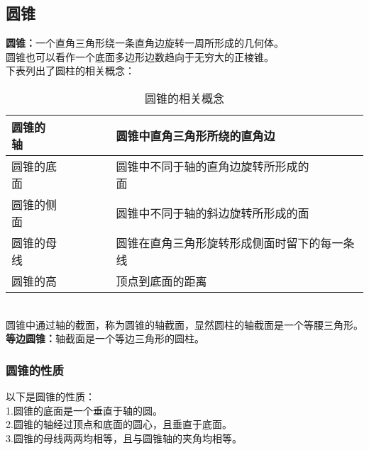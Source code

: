 \documentclass[UTF8]{ctexart}
\begin{document}
\subsection{圆锥}
    \textbf{圆锥：}一个直角三角形绕一条直角边旋转一周所形成的几何体。\\[3mm]
    圆锥也可以看作一个底面多边形边数趋向于无穷大的正棱锥。\\[3mm]
    下表列出了圆柱的相关概念：\vspace{5pt}
    \begin{table}[h]
        \begin{center}
            \begin{tabular}{l|l}
                \hline
                圆锥的轴~~~~~~~~&圆锥中直角三角形所绕的直角边~~~~~~~~\\ \hline
                圆锥的底面~~~~~~~~&圆锥中不同于轴的直角边旋转所形成的面~~~~~~~~\\ \hline
                圆锥的侧面~~~~~~~~&圆锥中不同于轴的斜边旋转所形成的面~~~~~~~~\\ \hline
                圆锥的母线~~~~~~~~&圆锥在直角三角形旋转形成侧面时留下的每一条线~~~~~~~~\\ \hline
                圆锥的高~~~~~~~~&顶点到底面的距离~~~~~~~~\\ \hline
            \end{tabular}
            \caption{圆锥的相关概念}
        \end{center}
    \end{table}\\
    圆锥中通过轴的截面，称为圆锥的轴截面，显然圆柱的轴截面是一个等腰三角形。\\[3mm]
    \textbf{等边圆锥：}轴截面是一个等边三角形的圆柱。\\

\subsubsection{圆锥的性质}
    以下是圆锥的性质：\\[3mm]
    1.圆锥的底面是一个垂直于轴的圆。\\[3mm]
    2.圆锥的轴经过顶点和底面的圆心，且垂直于底面。\\[3mm]
    3.圆锥的母线两两均相等，且与圆锥轴的夹角均相等。

\newpage
\end{document}
